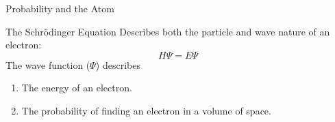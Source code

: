 \documentclass[handout,notes=hide]{beamer}
\begin{document}
\begin{frame}[t]{Probability and the Atom}
	\begin{block}{The Schrödinger Equation}
		Describes both the particle and wave nature of an electron:
		\begin{equation*}
			H\Psi = E\Psi
		\end{equation*}
		The wave function ($\Psi$) describes
		\begin{enumerate}
			\item The energy of an electron.
			\item The probability of finding an electron in a volume
				of space.
		\end{enumerate}
	\end{block}


\end{frame}
\end{document}
